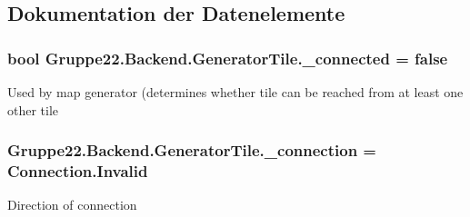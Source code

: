 \subsection{Dokumentation der Datenelemente}
\hypertarget{class_gruppe22_1_1_backend_1_1_generator_tile_ada6c954a36d01b4d1df4bb616df9d3fb}{
\subsubsection[{\-\_\-connected}]{\setlength{\rightskip}{0pt plus 5cm}bool Gruppe22.\-Backend.\-Generator\-Tile.\-\_\-connected = false\hspace{0.3cm}{\ttfamily [protected]}}}\label{class_gruppe22_1_1_backend_1_1_generator_tile_ada6c954a36d01b4d1df4bb616df9d3fb}


Used by map generator (determines whether tile can be reached from at least one other tile 

\hypertarget{class_gruppe22_1_1_backend_1_1_generator_tile_ac32f05dfbc85524404f187d9235ae982}{
\subsubsection[{\-\_\-connection}]{ Gruppe22.\-Backend.\-Generator\-Tile.\-\_\-connection = Connection.\-Invalid\hspace{0.3cm}{\ttfamily [protected]}}}\label{class_gruppe22_1_1_backend_1_1_generator_tile_ac32f05dfbc85524404f187d9235ae982}


Direction of connection 



